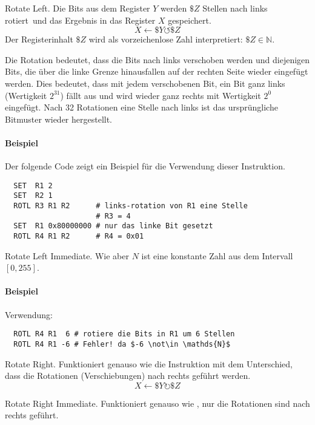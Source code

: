 \glqq Rotate Left\grqq. Die Bits aus dem Register $Y$ werden $\$Z$ Stellen nach
links \glqq rotiert\grqq\ und das Ergebnis in das Register $X$ gespeichert.
\[
    X \gets \$Y \circlearrowleft \$Z
\]
Der Registerinhalt $\$Z$ wird als vorzeichenlose Zahl interpretiert: 
$\$Z \in \mathds{N}$.

Die Rotation bedeutet, dass die Bits nach links verschoben
werden und diejenigen Bits, die über die linke Grenze hinausfallen auf der
rechten Seite wieder eingefügt werden. 
Dies bedeutet, dass mit jedem verschobenen Bit, ein Bit ganz links (Wertigkeit
$2^{31}$) fällt aus und wird wieder ganz rechts mit Wertigkeit $2^{0}$ eingefügt.
Nach 32 Rotationen eine Stelle nach links ist das ursprüngliche Bitmuster
wieder hergestellt.

\paragraph{Beispiel}
Der folgende Code zeigt ein Beispiel für die Verwendung dieser Instruktion.
\begin{lstlisting}
  SET  R1 2
  SET  R2 1
  ROTL R3 R1 R2      # links-rotation von R1 eine Stelle
                     # R3 = 4
  SET  R1 0x80000000 # nur das linke Bit gesetzt
  ROTL R4 R1 R2      # R4 = 0x01
\end{lstlisting}


\glqq Rotate Left Immediate\grqq.
Wie  aber $N$ ist eine konstante Zahl aus dem Intervall $[0, 255]$.

\paragraph{Beispiel}
Verwendung:
\begin{lstlisting}
  ROTL R4 R1  6 # rotiere die Bits in R1 um 6 Stellen
  ROTL R4 R1 -6 # Fehler! da $-6 \not\in \mathds{N}$
\end{lstlisting}



\glqq Rotate Right\grqq.
Funktioniert genauso wie die Instruktion  mit dem Unterschied, dass
die Rotationen (Verschiebungen) nach rechts geführt werden.
\[
    X \gets \$Y \circlearrowright \$Z
\]


\glqq Rotate Right Immediate\grqq.
Funktioniert genauso wie , nur die Rotationen sind nach rechts
geführt.



